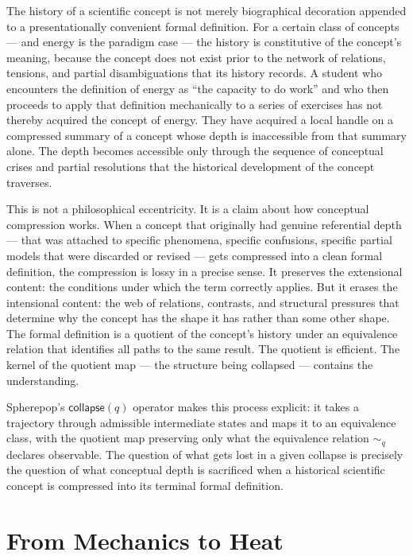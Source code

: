 \documentclass[12pt,openany]{book}
\theoremstyle{plain}
\theoremstyle{definition}
\theoremstyle{remark}
\newcommand{\scollapse}[1]{\mathsf{collapse}\!\left(#1\right)}
\begin{document}
The history of a scientific concept is not merely biographical decoration appended to a presentationally convenient formal definition. For a certain class of concepts — and energy is the paradigm case — the history is constitutive of the concept's meaning, because the concept does not exist prior to the network of relations, tensions, and partial disambiguations that its history records. A student who encounters the definition of energy as \enquote{the capacity to do work} and who then proceeds to apply that definition mechanically to a series of exercises has not thereby acquired the concept of energy. They have acquired a local handle on a compressed summary of a concept whose depth is inaccessible from that summary alone. The depth becomes accessible only through the sequence of conceptual crises and partial resolutions that the historical development of the concept traverses.

This is not a philosophical eccentricity. It is a claim about how conceptual compression works. When a concept that originally had genuine referential depth — that was attached to specific phenomena, specific confusions, specific partial models that were discarded or revised — gets compressed into a clean formal definition, the compression is lossy in a precise sense. It preserves the extensional content: the conditions under which the term correctly applies. But it erases the intensional content: the web of relations, contrasts, and structural pressures that determine why the concept has the shape it has rather than some other shape. The formal definition is a quotient of the concept's history under an equivalence relation that identifies all paths to the same result. The quotient is efficient. The kernel of the quotient map — the structure being collapsed — contains the understanding.

Spherepop's $\scollapse{q}$ operator makes this process explicit: it takes a trajectory through admissible intermediate states and maps it to an equivalence class, with the quotient map preserving only what the equivalence relation $\sim_q$ declares observable. The question of what gets lost in a given collapse is precisely the question of what conceptual depth is sacrificed when a historical scientific concept is compressed into its terminal formal definition.

\section{From Mechanics to Heat}
\end{document}

